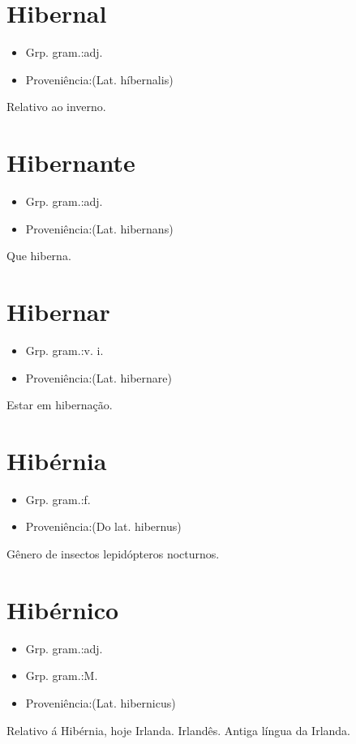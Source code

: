 \documentclass{article}
\begin{document}
\section{Hibernal}
\begin{itemize}
\item {Grp. gram.:adj.}
\end{itemize}
\begin{itemize}
\item {Proveniência:(Lat. \textunderscore híbernalis\textunderscore )}
\end{itemize}
Relativo ao inverno.
\section{Hibernante}
\begin{itemize}
\item {Grp. gram.:adj.}
\end{itemize}
\begin{itemize}
\item {Proveniência:(Lat. \textunderscore hibernans\textunderscore )}
\end{itemize}
Que hiberna.
\section{Hibernar}
\begin{itemize}
\item {Grp. gram.:v. i.}
\end{itemize}
\begin{itemize}
\item {Proveniência:(Lat. \textunderscore hibernare\textunderscore )}
\end{itemize}
Estar em hibernação.
\section{Hibérnia}
\begin{itemize}
\item {Grp. gram.:f.}
\end{itemize}
\begin{itemize}
\item {Proveniência:(Do lat. \textunderscore hibernus\textunderscore )}
\end{itemize}
Gênero de insectos lepidópteros nocturnos.
\section{Hibérnico}
\begin{itemize}
\item {Grp. gram.:adj.}
\end{itemize}
\begin{itemize}
\item {Grp. gram.:M.}
\end{itemize}
\begin{itemize}
\item {Proveniência:(Lat. \textunderscore hibernicus\textunderscore )}
\end{itemize}
Relativo á Hibérnia, hoje Irlanda.
Irlandês.
Antiga língua da Irlanda.
\end{document}
